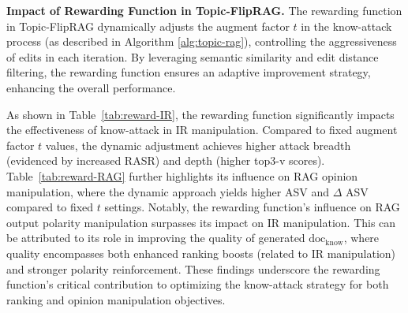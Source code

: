 \textbf{Impact of Rewarding Function in Topic-FlipRAG.} The rewarding function in Topic-FlipRAG dynamically adjusts the augment factor \(t\) in the know-attack process (as described in Algorithm \ref{alg:topic-rag}), controlling the aggressiveness of edits in each iteration. By leveraging semantic similarity and edit distance filtering, the rewarding function ensures an adaptive improvement strategy, enhancing the overall performance.

As shown in Table~\ref{tab:reward-IR}, the rewarding function significantly impacts the effectiveness of know-attack in IR manipulation. Compared to fixed augment factor \(t\) values, the dynamic adjustment achieves higher attack breadth (evidenced by increased RASR) and depth (higher top3-v scores). Table~\ref{tab:reward-RAG} further highlights its influence on RAG opinion manipulation, where the dynamic approach yields higher ASV and \(\Delta\) ASV compared to fixed \(t\) settings. Notably, the rewarding function's influence on RAG output polarity manipulation surpasses its impact on IR manipulation. This can be attributed to its role in improving the quality of generated $\text{doc}_{\text{know}}$, where quality encompasses both enhanced ranking boosts (related to IR manipulation) and stronger polarity reinforcement. These findings underscore the rewarding function's critical contribution to optimizing the know-attack strategy for both ranking and opinion manipulation objectives.



\begin{table}[!t]
  \centering
  \caption{Comparative analyses of rewarding function and fixed augment factor $t$ on IR manipulation attacks (\%).}
  \label{tab:reward-IR}
\end{table}

\begin{table}[t]
  \centering
  \caption{Comparative analyses of rewarding function and fixed augment factor $t$ on RAG opinion manipulation.}
  \label{tab:reward-RAG}
\end{table}

